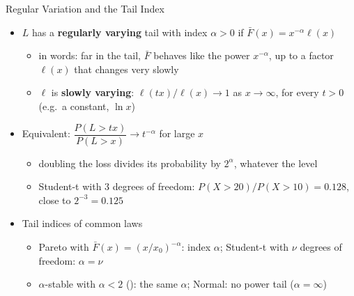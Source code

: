 \begin{frame}{Regular Variation and the Tail Index}
\itemsize{\small}
\begin{itemize}
    \item $L$ has a \textbf{regularly varying} tail with index $\alpha > 0$ if $\bar F(x) = x^{-\alpha}\ell(x)$
    \begin{itemize}
        \item in words: far in the tail, $\bar F$ behaves like the power $x^{-\alpha}$, up to a factor $\ell(x)$ that changes very slowly
        \item $\ell$ is \textbf{slowly varying}: $\ell(tx)/\ell(x) \to 1$ as $x \to \infty$, for every $t > 0$ (e.g.\ a constant, $\ln x$)
    \end{itemize}
    \item Equivalent: $\dfrac{P(L > tx)}{P(L > x)} \to t^{-\alpha}$ for large $x$
    \begin{itemize}
        \item doubling the loss divides its probability by $2^\alpha$, whatever the level
        \item Student-t with 3 degrees of freedom: $P(X > 20)/P(X > 10) = 0.128$, close to $2^{-3} = 0.125$
    \end{itemize}
    \item Tail indices of common laws
    \begin{itemize}
        \item Pareto with $\bar F(x) = (x/x_0)^{-\alpha}$: index $\alpha$; Student-t with $\nu$ degrees of freedom: $\alpha = \nu$
        \item $\alpha$-stable with $\alpha < 2$ (): the same $\alpha$; Normal: no power tail ($\alpha = \infty$)
    \end{itemize}
\end{itemize}
\end{frame}

